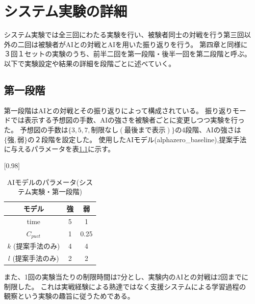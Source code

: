 \chapter{システム実験の詳細}
システム実験では全三回にわたる実験を行い、被験者同士の対戦を行う第三回以外の二回は被験者がAIとの対戦とAIを用いた振り返りを行う。
第四章と同様に３回１セットの実験のうち、前半二回を第一段階・後半一回を第二段階と呼ぶ。
以下で実験設定や結果の詳細を段階ごとに述べていく。
\section{第一段階}
第一段階はAIとの対戦とその振り返りによって構成されている。
振り返りモードでは表示する予想図の手数、AIの強さを被験者ごとに変更しつつ実験を行った。
予想図の手数は$\{3, 5, 7, 制限なし(最後まで表示)\}$の4段階、AIの強さは$\{強,弱\}$の２段階を設定した。
使用したAIモデル(alphazero\_baseline),提案手法に与えるパラメータを表\ref{table:param-system}に示す。
\begin{table}[H]
	\caption{AIモデルのパラメータ(システム実験・第一段階)}
	\centering
	\scalebox{0.98}[0.98]{
		\begin{tabular}{c|c|c}
			モデル&強&弱\\\hline
			time    & 5 & 1 \\ 
			$C_{puct}$ & 1   & 0.25 \\
			$k$ (提案手法のみ)     & 4 & 4 \\
			$l$ (提案手法のみ)     & 2 & 2 \\

		\end{tabular}
	}
	\label{table:param-system}
\end{table}
また、1回の実験当たりの制限時間は7分とし、実験内のAIとの対戦は2回までに制限した。
これは実戦経験による熟達ではなく支援システムによる学習過程の観察という実験の趣旨に従うためである。
